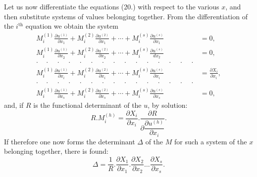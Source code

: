 \documentclass{article}
\begin{document}
Let us now differentiate the equations (20.) with respect to the various $x$, and then substitute systems of values belonging together. From the differentiation of the $i^{\text{th}}$ equation we obtain the system
\[
\begin{aligned}
M_{i}^{(1)}\frac{\partial u^{(1)}}{\partial x_{1}} + M_{i}^{(2)}\frac{\partial u^{(2)}}{\partial x_{1}} + \cdots + M_{i}^{(s)}\frac{\partial u^{(s)}}{\partial x_{1}} &= 0,\\
M_{i}^{(1)}\frac{\partial u^{(1)}}{\partial x_{2}} + M_{i}^{(2)}\frac{\partial u^{(2)}}{\partial x_{2}} + \cdots + M_{i}^{(s)}\frac{\partial u^{(s)}}{dx_{2}} &= 0,\\
\cdot\quad\cdot\quad\cdot\quad\cdot\quad\cdot\quad\cdot\quad\cdot\quad\cdot\quad\cdot\quad\cdot\quad\cdot\quad\cdot\quad\cdot\quad\cdot\quad\cdot & \\
M_{i}^{(1)}\frac{\partial u^{(1)}}{\partial x_{i}} + M_{i}^{(2)}\frac{\partial u^{(2)}}{\partial x_{i}} + \cdots + M_{i}^{(s)}\frac{\partial u^{(s)}}{\partial x_{i}} &= \frac{\partial X_{i}}{\partial x_{i}},\\
\cdot\quad\cdot\quad\cdot\quad\cdot\quad\cdot\quad\cdot\quad\cdot\quad\cdot\quad\cdot\quad\cdot\quad\cdot\quad\cdot\quad\cdot\quad\cdot\quad\cdot & \\
M_{i}^{(1)}\frac{\partial u^{(1)}}{\partial x_{s}} + M_{i}^{(2)}\frac{\partial u^{(2)}}{\partial x_{s}} + \cdots + M_{i}^{(s)}\frac{\partial u^{(s)}}{\partial x_{s}} &= 0,
\end{aligned}
\]
and, if $R$ is the functional determinant of the $u$, by solution:
\[
R.M_{i}^{(h)} = \frac{\partial X_{i}}{\partial x_{i}}.\frac{\partial R}{\partial\dfrac{\partial u^{(h)}}{\partial x_{i}}}.
\]
If therefore one now forms the determinant $\Delta$ of the $M$ for such a system of the $x$ belonging together, there is found:
\[
\Delta = \frac{1}{R}.\frac{\partial X_{1}}{\partial x_{1}}.\frac{\partial X_{2}}{\partial x_{2}}\ldots\frac{\partial X_{s}}{\partial x_{s}}. \tag{21.}
\]
\end{document}
